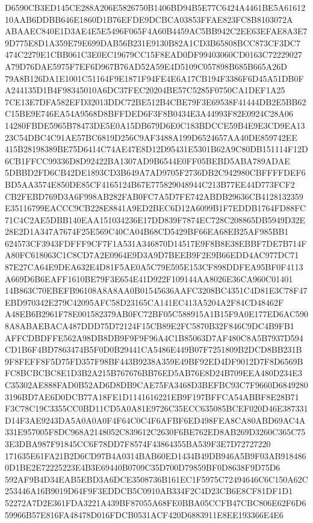\documentclass[UTF8,fontset=fandol,zihao=-4,a4paper]{ctexart}
\begin{document}
{{D6590CB3ED145CE288A206E5826750B1406BD94B5E77C6424A4461BE5A6161210AAB6DDBB646E1860D1B76EFDE9DCBCA03853FFAE823FC8B8103072A
ABAAEC840E1D3AE4E5E5496F065F4A60B4459AC5BB942C2EE63EFAE8A3E79D775E8D1A359E79E699DAB56B231E9130B82A1CD3B65808BCC873CF3DC7
474C2279E1CBB061C3E0EC19679CC15F8EAD0DF99403060CD0163C72229027A79D76DAE5975F7EF6D967B76AD52A59E4D5109C057898B685B665A26D
79A8B126DA1E1001C51164F9E1871F94FE4E6A17CB194F3386F6D45A51DB0FA244135D1B4F98345010A6DC37FEC20204BE57C5285F0750CA1DEF1A25
7CE13E7DFA582EFD32013DDC72BE512B4CBE79F3E69538F41444DB2E5BB62C15BE9E746EA54A9568D8BFFDED6F3F8B0434E3A44993F82E0924C28A06
14280FBDE5965B78473DE5E0A15DB679D6E0C183BDCCE59B4E9E3CD9EA1323C54DBC4C91AE57BC6819D256C9AF3488A199D6524657AA40DE859742EE
415B28198389BE75D6414C74AE47E8D12D95431E5301B62A9C80DB151114F12D6CB1FFCC99336D8D92422BA1307AD9B6544E0FF05BEBD5ABA789ADAE
5DBBD2FD6CB42DE1893CD3B649A7AD9705F2736DB2C942980CBFFFFDEF6BD5AA3574E850DE85CF4165124B67E775829048944C213B77EE44D773FCF2
CB2FEBD769D3A6F998AB282FAB0FC7A5D7FE742ABDB29636CB4128132359E35116799EACCC9CB228E8841A9ED2BEC6D12A6099B1F7EDDB1764FD88FC
71C4C2AE5DBB140EAA151034236E17DD839F7874EC728C208865DB5949D32E28E2D1A347A7674F25E569C40CA04B68CD5429BF66EA68EB25AF985BB1
624573CF3943FDFFF9CF7F1A531A346870D14517E9F8B8E38EBBF7DE7B714FA80FC618063C1C8CD7A2E0964E9D3A9D7BEEB9F2E9B66EDD4AC977DC71
87E27CA64E9DEA632E4D81F5AE0A5C79E595E153CF898DDFEA95BF0F4113A669D6B6EAFF1610BE79F3E654E41D922F109144AA8026E36CA960C01401
14B863C70EBEFB96108A8A8AA0B01545636AAFC3208BC4351C4D81E3C78F47EBD970342E279C42095AFC58D23165CA141EC413A5204A2F84CD48462F
A48EB6B2961F78E001582379AB0FC72BF05C588915A1B15F9A0E177ED6AC5908A8ABAEBACA487DDD75D72124F15CB89E2FC5870B32F846C9DC4B9FB1
AFFCDBDFFE562A98DB8DB9F9F9F96A4C1B85063D7AF480C8A5B7937D594CD1B6F4BD7863474B5F0D0B29441CA5486E449B07F7251809B2DCD8BB231B
9F8FEFF8F5D75FD357F98BF443B9238A359E49BF92ED4DF9012D7F8D6569BFC8BCBCBC8E1D3B2A215B767676BB76ED5AB76E8D24B709EEA480D234E3
C35302AE888FAD0B52AD6D8DB9CAE75FA3468D3BEFBC93C7F9660D68492803196BD7AE6D0DCB77A18FE1D1141616221EB9F197BFFCA54ABBF8E28B71
F3C78C19C3355CC0BD11CD5A0A81E9726C35ECC635085BCEF020D46E387331D14F3AE9243DA5A0A0A0F4F64C0C4F6AFBF6ED498FEA8CA80ABD69AC4A
331E957005F8DC968A2148052C839612C2630F6BE762ED8AB269D3260C365C753E3DBA987F91845CC6F78DD7F8574F43864355BA539F3E7D72727220
171635E61FA21B2D6CD97B4A0314BAB60ED1434B49DB946A5B9F03AB9184860D1BE2E72225223E4B3E69440B0709C35D700D79859BF0D8638F9D75D6
592AF9B4D34EAB5EBD3A6DCE3508736B161EC1F5975C72494646C6C150A62C253446A16B9019D64F9F3EDDCB5C0910AB334F2C4D23CB6E8CF81DF1D1
52272A7D2E361FDA3221A439BF87055A68FE0BBA05CCFB47CBC806E62F6D659966B57E816FA48478D016FDCB0531ACF420D6883911E8EE193366E4E6
}}
\end{document}
